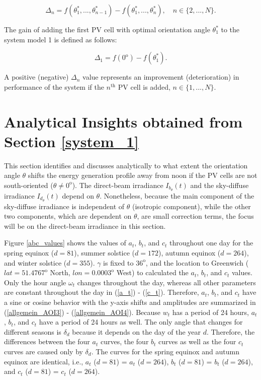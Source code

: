 \begin{equation} \label{Delta_n}
\Delta_n=f(\theta_1^*,...,\theta_{n-1}^*)-f(\theta_1^*,...,\theta_n^*),\quad n\in \{2, ..., N\}.
\end{equation}


The gain of adding the first PV cell with optimal orientation angle $\theta_1^*$ to the system model 1 is defined as follows:

\begin{equation}\label{Delta_1}
\Delta_1=f(0^\mathrm{o})-f(\theta_1^*).
\end{equation}


A positive (negative) $\Delta_n$ value represents an improvement (deterioration) in performance of the system if the $n^{\mathrm{th}}$ PV cell is added, $n\in\{1, ..., N\}$.

\section{Analytical Insights obtained from Section \ref{system_1}\label{analytical}}
This section identifies and discusses analytically to what extent the orientation angle $\theta$ shifts the energy generation profile away from noon if the PV cells are not south-oriented ($\theta \neq 0^\mathrm{o}$). The direct-beam irradiance $I_{b_\theta}(t)$ and the sky-diffuse irradiance  $I_{d_\theta}(t)$ depend on $\theta$. Nonetheless, because the
main component of the sky-diffuse irradiance is independent of $\theta$ (isotropic component), while the other two components, which are dependent on $\theta$, are small correction terms, the focus will be on the direct-beam irradiance in this section.

Figure \ref{abc_values} shows the values of $a_t$, $b_t$, and $c_t$ throughout one day for the spring equinox ($d=81$), summer solstice ($d=172$), autumn equinox ($d=264$), and winter solstice ($d=355$). $\gamma$ is fixed to $36^{\mathrm{o}}$, and the location to Greenwich ($lat=51.4767^{\mathrm{o}}$ North, $lon=0.0003^{\mathrm{o}}$ West) to calculated the $a_t$, $b_t$, and $c_t$ values. Only the hour angle $\omega_t$ changes throughout the day, whereas all other parameters are constant throughout the day in (\ref{a_t}) - (\ref{c_t}). Therefore, $a_t$, $b_t$, and $c_t$ have a sine or cosine behavior with the y-axis shifts and amplitudes are summarized in (\ref{allgemein_AOI3}) - (\ref{allgemein_AOI4}). Because $w_t$ has a period of 24 hours, $a_t$, $b_t$, and $c_t$ have a period of 24 hours as well. 
The only angle that changes for different seasons is $\delta_d$ because it depends on the day of the year $d$. Therefore, the differences between the four $a_t$ curves, the four $b_t$ curves as well as the four $c_t$ curves are caused only by $\delta_d$. The curves for the spring equinox and autumn equinox are identical, i.e., $a_t$ ($d=81$) = $a_t$ ($d=264$), $b_t$ ($d=81$) = $b_t$ ($d=264$), and $c_t$ ($d=81$) = $c_t$ ($d=264$). 



